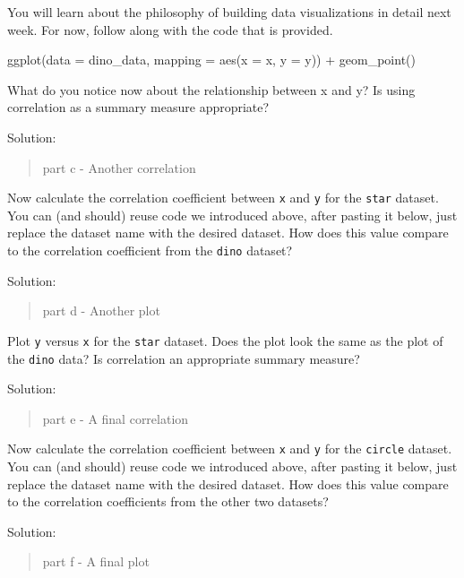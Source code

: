 \documentclass[
  letterpaper,
  DIV=11,
  numbers=noendperiod]{scrartcl}
\newenvironment{Shaded}{\begin{snugshade}}{\end{snugshade}}
\newcommand{\AttributeTok}[1]{\textcolor[rgb]{0.40,0.45,0.13}{#1}}
\newcommand{\FunctionTok}[1]{\textcolor[rgb]{0.28,0.35,0.67}{#1}}
\newcommand{\NormalTok}[1]{\textcolor[rgb]{0.00,0.23,0.31}{#1}}
\newcommand{\SpecialCharTok}[1]{\textcolor[rgb]{0.37,0.37,0.37}{#1}}
\begin{document}
You will learn about the philosophy of building data visualizations in
detail next week. For now, follow along with the code that is provided.

\begin{Shaded}
\begin{Highlighting}[]
\FunctionTok{ggplot}\NormalTok{(}\AttributeTok{data =}\NormalTok{ dino\_data, }\AttributeTok{mapping =} \FunctionTok{aes}\NormalTok{(}\AttributeTok{x =}\NormalTok{ x, }\AttributeTok{y =}\NormalTok{ y)) }\SpecialCharTok{+}
  \FunctionTok{geom\_point}\NormalTok{()}
\end{Highlighting}
\end{Shaded}

What do you notice now about the relationship between x and y? Is using
correlation as a summary measure appropriate?

Solution:

\begin{quote}
part c - Another correlation
\end{quote}

Now calculate the correlation coefficient between \texttt{x} and
\texttt{y} for the \texttt{star} dataset. You can (and should) reuse
code we introduced above, after pasting it below, just replace the
dataset name with the desired dataset. How does this value compare to
the correlation coefficient from the \texttt{dino} dataset?

Solution:

\begin{quote}
part d - Another plot
\end{quote}

Plot \texttt{y} versus \texttt{x} for the \texttt{star} dataset. Does
the plot look the same as the plot of the \texttt{dino} data? Is
correlation an appropriate summary measure?

Solution:

\begin{quote}
part e - A final correlation
\end{quote}

Now calculate the correlation coefficient between \texttt{x} and
\texttt{y} for the \texttt{circle} dataset. You can (and should) reuse
code we introduced above, after pasting it below, just replace the
dataset name with the desired dataset. How does this value compare to
the correlation coefficients from the other two datasets?

Solution:

\begin{quote}
part f - A final plot
\end{quote}
\end{document}
